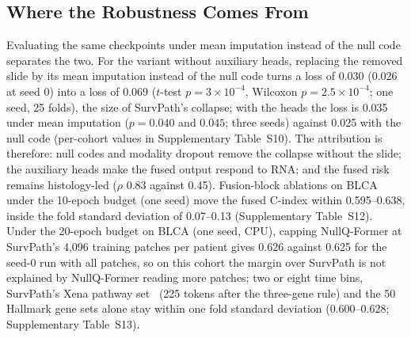 \documentclass[journal]{IEEEtran}
\newcommand{\pq}{NullQ-Former}
\newcommand{\cindex}{C-index}
\begin{document}
\subsection{Where the Robustness Comes From}
\label{sec:where}
Evaluating the same checkpoints under mean imputation instead of the null code separates the two. For the variant without auxiliary heads, replacing the removed slide by its mean imputation instead of the null code turns a loss of 0.030 (0.026 at seed 0) into a loss of 0.069 ($t$-test $p = 3 \times 10^{-4}$, Wilcoxon $p = 2.5 \times 10^{-4}$; one seed, 25 folds), the size of SurvPath's collapse; with the heads the loss is 0.035 under mean imputation ($p = 0.040$ and $0.045$; three seeds) against 0.025 with the null code (per-cohort values in Supplementary Table~S10). The attribution is therefore: null codes and modality dropout remove the collapse without the slide; the auxiliary heads make the fused output respond to RNA; and the fused risk remains histology-led ($\rho$ 0.83 against 0.45). Fusion-block ablations on BLCA under the 10-epoch budget (one seed) move the fused \cindex{} within 0.595--0.638, inside the fold standard deviation of 0.07--0.13 (Supplementary Table~S12). Under the 20-epoch budget on BLCA (one seed, CPU), capping \pq{} at SurvPath's 4,096 training patches per patient gives 0.626 against 0.625 for the seed-0 run with all patches, so on this cohort the margin over SurvPath is not explained by \pq{} reading more patches; two or eight time bins, SurvPath's Xena pathway set~\cite{goldman2020xena} (225 tokens after the three-gene rule) and the 50 Hallmark gene sets alone stay within one fold standard deviation (0.600--0.628; Supplementary Table~S13).
\end{document}
